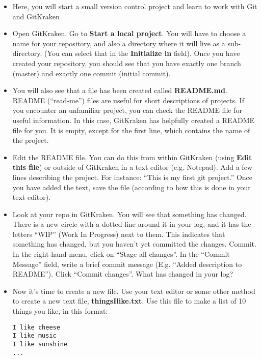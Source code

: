 \documentclass[pdflatex,a4paper]{article}
\begin{document}
\begin{itemize}
\item
Here, you will start a small version control project and learn to work with Git and GitKraken
\item
Open GitKraken. Go to \textbf{Start a local project}. You will have to choose a name for your repository, and also a directory where it will live as a sub-directory. (You can select that in the \textbf{Initialize in} field). Once you have created your repository, you should see that you have exactly one branch (master) and exactly one commit (initial commit). 
\item
You will also see that a file has been created called \textbf{README.md}. README (``read-me'') files are useful for short descriptions of projects. If you encounter an unfamiliar project, you can check the README file for useful information. In this case, GitKraken has helpfully created a README file for you. It is empty, except for the first line, which contains the name of the project. 
\item
Edit the README file. You can do this from within GitKraken (using \textbf{Edit this file}) or outside of GitKraken in a text editor (e.g. Notepad). Add a few lines describing the project. For instance: ``This is my first git project.'' Once you have added the text, save the file (according to how this is done in your text editor). 
\item
Look at your repo in GitKraken. You will see that something has changed. There is a new circle with a dotted line around it in your log, and it has the letters ``WIP'' (Work In Progress) next to them. This indicates that something has changed, but you haven't yet committed the changes. Commit. In the right-hand menu, click on ``Stage all changes''. In the ``Commit Message'' field, write a brief commit message (E.g. ``Added description to README''). Click ``Commit changes''. What has changed in your log?
\item
Now it's time to create a new file. Use your text editor or some other method to create a new text file, \textbf{thingsIlike.txt}. Use this file to make a list of 10 things you like, in this format: 

\begin{verbatim}
I like cheese 
I like music
I like sunshine
... 
\end{verbatim}


\end{itemize}
\end{document}
